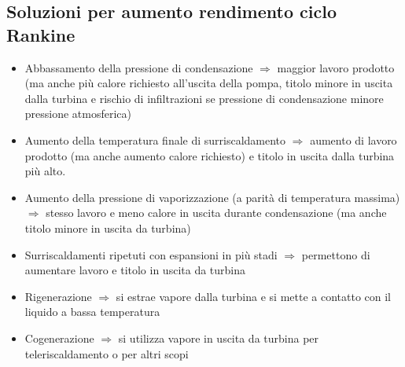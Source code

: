 \subsection{Soluzioni per aumento rendimento ciclo Rankine}

\begin{itemize}
    \item Abbassamento della pressione di condensazione $\Rightarrow$ maggior lavoro prodotto (ma anche più calore richiesto all'uscita della pompa, titolo minore in uscita dalla turbina e rischio di infiltrazioni se pressione di condensazione minore pressione atmosferica)
    \item Aumento della temperatura finale di surriscaldamento $\Rightarrow$ aumento di lavoro prodotto (ma anche aumento calore richiesto) e titolo in uscita dalla turbina più alto.
    \item Aumento della pressione di vaporizzazione (a parità di temperatura massima) $\Rightarrow$ stesso lavoro e meno calore in uscita durante condensazione (ma anche titolo minore in uscita da turbina)
    \item Surriscaldamenti ripetuti con espansioni in più stadi $\Rightarrow$ permettono di aumentare lavoro e titolo in uscita da turbina
    \item Rigenerazione $\Rightarrow$ si estrae vapore dalla turbina e si mette a contatto con il liquido a bassa temperatura
    \item Cogenerazione $\Rightarrow$ si utilizza vapore in uscita da turbina per teleriscaldamento o per altri scopi
\end{itemize}
